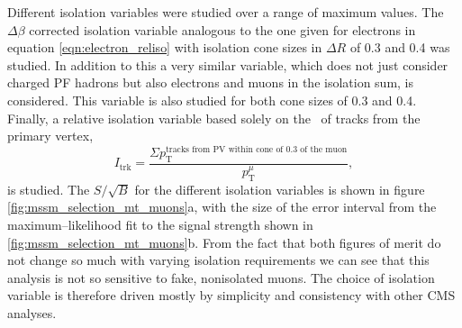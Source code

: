 Different isolation variables were studied over a range of maximum
values. The $\Delta\beta$ corrected isolation variable analogous
to the one given for electrons in equation \ref{eqn:electron_reliso} with 
isolation cone sizes in $\Delta R$ of 0.3 and 0.4 was studied. In addition
to this a very similar
variable, which does not just consider charged \ac{PF} hadrons but
also electrons and muons in the isolation sum, is considered. This
variable is also studied for both cone sizes of 0.3 and 0.4. Finally,
a relative isolation variable based solely on the \pT~of tracks from the primary
vertex,
\begin{equation}\label{eqn:reltrkiso}
I_{\text{trk}} = \frac{\Sigma p_{\text{T}}^{\text{tracks from PV within cone of 0.3 of the muon}}}{p_{\text{T}}^{\mu}}, \end{equation} 
is studied. The $S/\sqrt{B}$ for the different isolation variables is shown in figure \ref{fig:mssm_selection_mt_muons}a, with the
size of the error interval from the maximum--likelihood fit to the \Ztautau signal strength shown in 
\ref{fig:mssm_selection_mt_muons}b. From the fact that both figures of merit do not
change so much with varying isolation requirements we can see that this analysis
is not so sensitive to fake, nonisolated muons. The choice of isolation variable is therefore
driven mostly by simplicity and consistency with other \ac{CMS} analyses.

